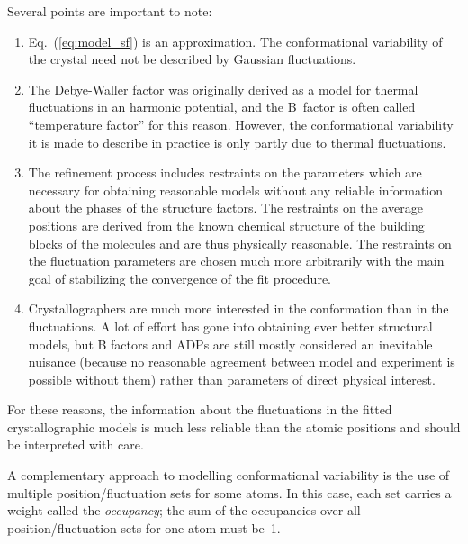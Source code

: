 \documentclass[11pt]{article}
\begin{document}
\begin{sloppy}
Several points are important to note:
\begin{enumerate}
\item
  Eq.~(\ref{eq:model_sf}) is an approximation. The conformational
  variability of the crystal need not be described by Gaussian
  fluctuations.
\item
  The Debye-Waller factor was originally derived as a model for
  thermal fluctuations in an harmonic potential, and the B~factor is
  often called ``temperature factor'' for this reason. However, the
  conformational variability it is made to describe in practice is
  only partly due to thermal fluctuations.
\item
  The refinement process includes restraints on the parameters which
  are necessary for obtaining reasonable models without any reliable
  information about the phases of the structure factors.
  The restraints on the average positions are derived from the known
  chemical structure of the building blocks of the molecules and are
  thus physically reasonable. The restraints on the fluctuation
  parameters are chosen much more arbitrarily with the main goal
  of stabilizing the convergence of the fit procedure.
\item
  Crystallographers are much more interested in the conformation than
  in the fluctuations. A lot of effort has gone into obtaining ever
  better structural models, but B factors and ADPs are still mostly
  considered an inevitable nuisance (because no reasonable agreement
  between model and experiment is possible without them) rather than
  parameters of direct physical interest.
\end{enumerate}
For these reasons, the information about the fluctuations in the fitted
crystallographic models is much less reliable than the atomic positions
and should be interpreted with care.

A complementary approach to modelling conformational variability is
the use of multiple position/fluctuation sets for some atoms. In this
case, each set carries a weight called the \textit{occupancy}; the sum
of the occupancies over all position/fluctuation sets for one atom
must be~1.

\vspace{3mm}


\end{sloppy}
\end{document}
